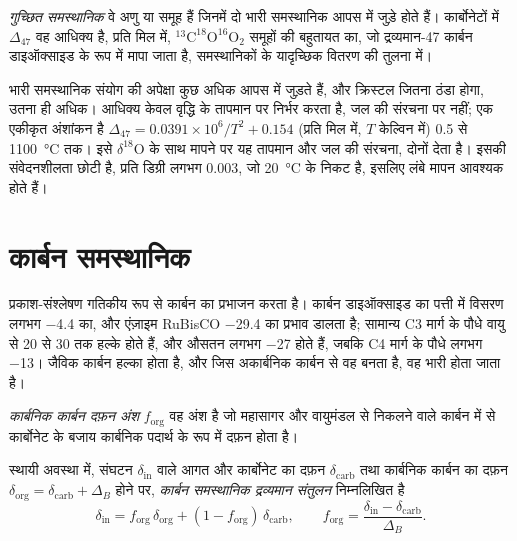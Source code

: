 \begin{definition}[गुच्छित समस्थानिक]\label{def:b3:stable-isotopes:clumped}
\emph{गुच्छित समस्थानिक} वे अणु या समूह हैं जिनमें
दो भारी समस्थानिक आपस में जुड़े होते हैं। कार्बोनेटों में $\Delta_{47}$ वह
आधिक्य है, प्रति मिल में, $^{13}\mathrm C^{18}\mathrm O^{16}\mathrm O_2$ समूहों की बहुतायत का,
जो द्रव्यमान-47 कार्बन डाइऑक्साइड के रूप में मापा जाता है, समस्थानिकों के यादृच्छिक
वितरण की तुलना में।
\end{definition}

भारी समस्थानिक संयोग की अपेक्षा कुछ अधिक आपस में जुड़ते हैं,
और क्रिस्टल जितना ठंडा होगा, उतना ही अधिक। आधिक्य केवल
वृद्धि के तापमान पर निर्भर करता है, जल की संरचना पर नहीं; एक एकीकृत
अंशांकन है $\Delta_{47} = 0.0391\times10^6/T^2 + 0.154$ (प्रति मिल में, $T$
केल्विन में) 0.5 से \qty{1100}{\celsius} तक। इसे
$\delta^{18}\mathrm O$ के साथ मापने पर यह तापमान और
जल की संरचना, दोनों देता है। इसकी संवेदनशीलता छोटी है, प्रति डिग्री लगभग \qty{0.003}{\permil}, जो
\qty{20}{\celsius} के निकट है, इसलिए लंबे मापन आवश्यक होते हैं।

\section{कार्बन समस्थानिक}\label{sec:b3:stable-isotopes:carbon}

प्रकाश-संश्लेषण गतिकीय रूप से कार्बन का प्रभाजन करता है। कार्बन
डाइऑक्साइड का पत्ती में विसरण लगभग \qty{-4.4}{\permil} का, और एंज़ाइम RuBisCO
\qty{-29.4}{\permil} का प्रभाव डालता है; सामान्य C3 मार्ग के पौधे वायु से \num{20} से
\qty{30}{\permil} तक हल्के होते हैं, और औसतन लगभग
\qty{-27}{\permil} होते हैं, जबकि C4 मार्ग के पौधे लगभग \qty{-13}{\permil}। जैविक
कार्बन हल्का होता है, और जिस अकार्बनिक कार्बन से वह बनता है, वह भारी होता जाता है।

\begin{definition}[कार्बनिक कार्बन दफ़न अंश]\label{def:b3:stable-isotopes:forg}
\emph{कार्बनिक कार्बन दफ़न अंश}
$f_{\mathrm{org}}$ वह अंश है जो महासागर और वायुमंडल से निकलने वाले
कार्बन में से कार्बोनेट के बजाय कार्बनिक पदार्थ के रूप में दफ़न होता है।
\end{definition}

\begin{proposition}[कार्बन समस्थानिक द्रव्यमान संतुलन]\label{prop:b3:stable-isotopes:forg}
स्थायी अवस्था में, संघटन $\delta_{\mathrm{in}}$ वाले आगत और कार्बोनेट का दफ़न
$\delta_{\mathrm{carb}}$ तथा कार्बनिक कार्बन का दफ़न $\delta_{\mathrm{org}} =
\delta_{\mathrm{carb}} + \Delta_B$ होने पर, \emph{कार्बन समस्थानिक
द्रव्यमान संतुलन} निम्नलिखित है
\[
\delta_{\mathrm{in}} = f_{\mathrm{org}}\,\delta_{\mathrm{org}} + (1 - f_{\mathrm{org}})\,
\delta_{\mathrm{carb}}, \qquad f_{\mathrm{org}} = \frac{\delta_{\mathrm{in}} -
\delta_{\mathrm{carb}}}{\Delta_B}.
\]
\end{proposition}


